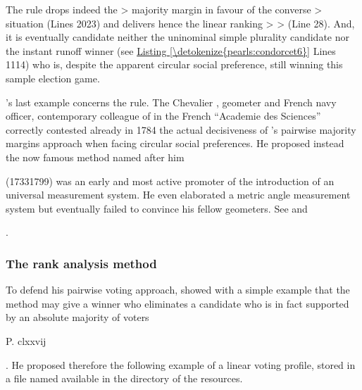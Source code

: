 \documentclass[a4paper,12pt,english]{sphinxhowto}
\begin{document}
\sphinxresetverbatimhllines

\sphinxAtStartPar
The  rule drops indeed the  \textgreater{}  majority margin in favour of the converse  \textgreater{}  situation (Lines 20\sphinxhyphen{}23) and delivers hence the linear ranking  \textgreater{}  \textgreater{}  (Line 28). And, it is eventually candidate  \textendash{}neither the uninominal simple plurality candidate nor the instant runoff winner (see \hyperref[\detokenize{pearls:condorcet6}]{Listing \ref{\detokenize{pearls:condorcet6}}} Lines 11\sphinxhyphen{}14)\textendash{} who is, despite the apparent circular social preference, still winning this sample election game.

\sphinxAtStartPar
{}’s last example concerns the  rule. The Chevalier , geometer and French navy officer, contemporary colleague of  in the French “Academie des Sciences” correctly contested already in 1784 the actual decisiveness of ’s pairwise majority margins approach when facing circular social preferences. He proposed instead the now famous  method named after him %
\begin{footnote}[17]\sphinxAtStartFootnote
{} (1733\sphinxhyphen{}1799) was an early and most active promoter of the introduction of an universal  measurement system. He even elaborated a metric angle measurement system but eventually failed to convince his fellow geometers. See  and 
%
\end{footnote}.


\subsubsection{The  rank analysis method}
\label{\detokenize{pearls:the-borda-rank-analysis-method}}
\sphinxAtStartPar
To defend his pairwise voting approach,  showed with a simple example that the  method may give a  winner who eliminates a candidate who is in fact supported by an absolute majority of voters %
\begin{footnote}[18]\sphinxAtStartFootnote
{} P. clxxvij
%
\end{footnote}. He proposed therefore the following example of a linear voting profile, stored in a file named  available in the  directory of the  resources.
\end{document}
